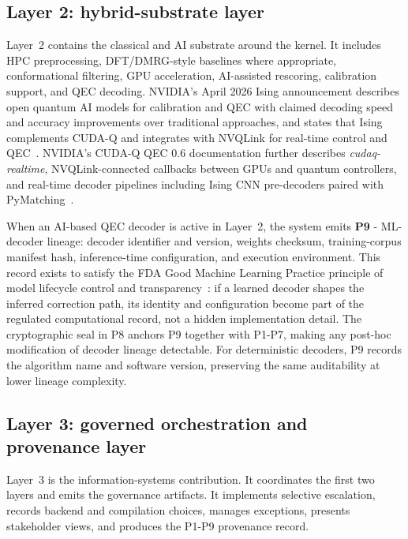 \documentclass[11pt,letterpaper]{article}
\begin{document}
\subsection{Layer 2: hybrid-substrate layer}
\label{sec:layer2}

Layer~2 contains the classical and AI substrate around the kernel.  It includes HPC
preprocessing, DFT/DMRG-style baselines where appropriate, conformational filtering, GPU
acceleration, AI-assisted rescoring, calibration support, and QEC decoding.  NVIDIA's April
2026 Ising announcement describes open quantum AI models for calibration and QEC with claimed
decoding speed and accuracy improvements over traditional approaches, and states that Ising
complements CUDA-Q and integrates with NVQLink for real-time control and
QEC~\cite{ising2026nvidia}.  NVIDIA's CUDA-Q QEC 0.6 documentation further describes
\textit{cudaq-realtime}, NVQLink-connected callbacks between GPUs and quantum controllers,
and real-time decoder pipelines including Ising CNN pre-decoders paired with
PyMatching~\cite{cudaqec2026}.

When an AI-based QEC decoder is active in Layer~2, the system emits \textbf{P9} - ML-decoder
lineage: decoder identifier and version, weights checksum, training-corpus manifest hash,
inference-time configuration, and execution environment.  This record exists to satisfy the
FDA Good Machine Learning Practice principle of model lifecycle control and
transparency~\cite{fda2021gmlp}: if a learned decoder shapes the inferred correction path, its
identity and configuration become part of the regulated computational record, not a hidden
implementation detail.  The cryptographic seal in P8 anchors P9 together with P1-P7, making
any post-hoc modification of decoder lineage detectable.  For deterministic decoders, P9
records the algorithm name and software version, preserving the same auditability at lower
lineage complexity.

\subsection{Layer 3: governed orchestration and provenance layer}
\label{sec:layer3}

Layer~3 is the information-systems contribution.  It coordinates the first two layers and
emits the governance artifacts.  It implements selective escalation, records backend and
compilation choices, manages exceptions, presents stakeholder views, and produces the P1-P9
provenance record.
\end{document}
